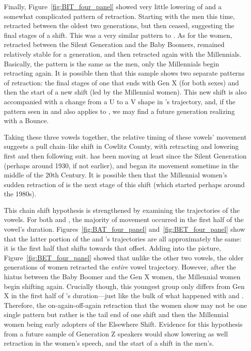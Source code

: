 Finally, Figure~\ref{fig:BIT_four_panel} showed very little lowering of \bit and a somewhat complicated pattern of retraction. Starting with the men this time, \bit retracted between the oldest two generations, but then ceased, suggesting the final stages of a shift. This was a very similar pattern to \bet. As for the women, \bit retracted between the Silent Generation and the Baby Boomers, remained relatively stable for a generation, and then retracted again with the Millennials. Basically, the pattern is the same as the men, only the Millennials begin retracting again. It is possible then that this sample shows two separate patterns of retraction: the final stages of one that ends with Gen X (for both sexes) and then the start of a new shift (led by the Millennial women). This new shift is also accompanied with a change from a U to a V shape in \bit's trajectory, and, if the pattern seen in \bat and \bet also applies to \bit, we may find a future generation realizing \bit with a Bounce.

Taking these three vowels together, the relative timing of these vowels' movement suggests a pull chain--like shift in Cowlitz County, with \bat retracting and lowering first and then \bet following suit. \bat has been moving at least since the Silent Generation (perhaps around 1930, if not earlier), and \bet began its movement sometime in the middle of the 20th Century. It is possible then that the Millennial women's sudden retraction of \bit is the next stage of this shift (which started perhaps around the 1980s).

This chain shift hypothesis is strengthened by examining the trajectories of the vowels. For both \bat and \bet, the majority of movement occurred in the first half of the vowel's duration. Figures~\ref{fig:BAT_four_panel} and~\ref{fig:BET_four_panel} show that the latter portion of the \bat and \bet's trajectories are all approximately the same: it is the first half that shifts towards that offset. Adding \bit into the picture, Figure~\ref{fig:BET_four_panel} showed that unlike the other two vowels, the older generations of women retracted the \textit{entire} vowel trajectory. However, after the hiatus between the Baby Boomer and the Gen X women, the Millennial women begin shifting again. Crucially though, this youngest group only differs from Gen X in the first half of \bit's duration---just like the bulk of what happened with \bet and \bat. Therefore, the on-again-off-again \bit retraction that the women show may not be one single pattern but rather is the tail end of one shift and then the Millennial women being early adopters of the Elsewhere Shift. Evidence for this hypothesis from a future sample of Generation Z speakers would show lowering as well retraction in the women's speech, and the start of a shift in the men's.

